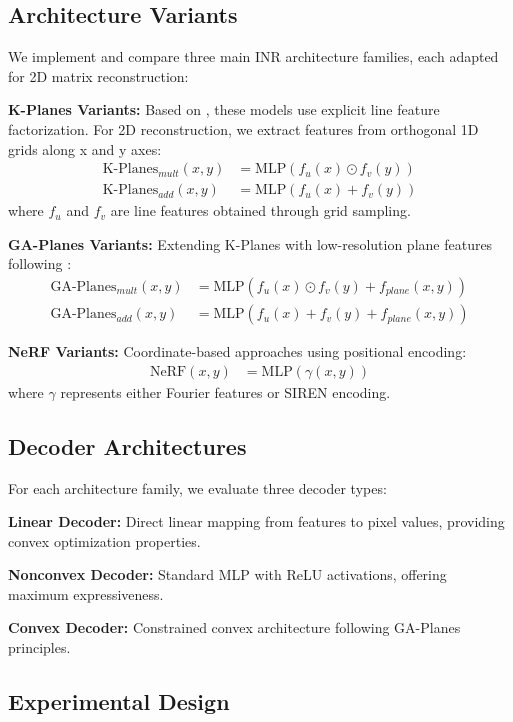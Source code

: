 \documentclass{article}
\begin{document}
\subsection{Architecture Variants}

We implement and compare three main INR architecture families, each adapted for 2D matrix reconstruction:

\textbf{K-Planes Variants:} Based on \cite{fridovich2023kplanes}, these models use explicit line feature factorization. For 2D reconstruction, we extract features from orthogonal 1D grids along x and y axes:
\begin{align}
\text{K-Planes}_{mult}(x,y) &= \text{MLP}(f_u(x) \odot f_v(y)) \\
\text{K-Planes}_{add}(x,y) &= \text{MLP}(f_u(x) + f_v(y))
\end{align}
where $f_u$ and $f_v$ are line features obtained through grid sampling.

\textbf{GA-Planes Variants:} Extending K-Planes with low-resolution plane features following \cite{sivgin2024gaplanes}:
\begin{align}
\text{GA-Planes}_{mult}(x,y) &= \text{MLP}(f_u(x) \odot f_v(y) + f_{plane}(x,y)) \\
\text{GA-Planes}_{add}(x,y) &= \text{MLP}(f_u(x) + f_v(y) + f_{plane}(x,y))
\end{align}

\textbf{NeRF Variants:} Coordinate-based approaches using positional encoding:
\begin{align}
\text{NeRF}(x,y) &= \text{MLP}(\gamma(x,y))
\end{align}
where $\gamma$ represents either Fourier features or SIREN encoding.

\subsection{Decoder Architectures}

For each architecture family, we evaluate three decoder types:

\textbf{Linear Decoder:} Direct linear mapping from features to pixel values, providing convex optimization properties.

\textbf{Nonconvex Decoder:} Standard MLP with ReLU activations, offering maximum expressiveness.

\textbf{Convex Decoder:} Constrained convex architecture following GA-Planes principles.

\subsection{Experimental Design}
\end{document}
